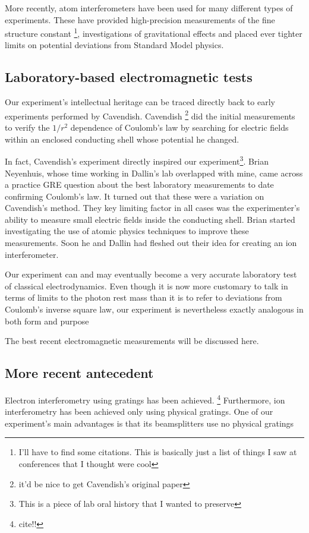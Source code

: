 More recently, atom interferometers have been used for many different types of experiments. These have provided high-precision measurements of the fine structure constant \footnote{I'll have to find some citations. This is basically just a list of things I saw at conferences that I thought were cool}, investigations of gravitational effects and placed ever tighter limits on potential deviations from Standard Model physics. 

\subsection{Laboratory-based electromagnetic tests}
Our experiment's intellectual heritage can be traced directly back to early experiments performed by Cavendish. Cavendish \cite{jackson} \footnote{it'd be nice to get Cavendish's original paper} did the initial measurements to verify the $1/r^2$ dependence of Coulomb's law by searching for electric fields \cite{jackson} within an enclosed conducting shell whose potential he changed. 

In fact, Cavendish's experiment directly inspired our experiment\footnote{This is a piece of lab oral history that I wanted to preserve}. Brian Neyenhuis, whose time working in Dallin's lab overlapped with mine, came across a practice GRE question about the best laboratory measurements to date confirming Coulomb's law. It turned out that these were a variation on Cavendish's method. They key limiting factor in all cases was the experimenter's ability to measure small electric fields inside the conducting shell. Brian started investigating the use of atomic physics techniques to improve these measurements. Soon he and Dallin had fleshed out their idea for creating an ion interferometer.  

Our experiment can and may eventually become a very accurate laboratory test of classical electrodynamics.
Even though it is now more customary to talk in terms of limits to the photon rest mass than it is to refer to deviations from Coulomb's inverse square law, our experiment is nevertheless exactly analogous in both form and purpose

The best recent electromagnetic measurements will be discussed here. 

\subsection{More recent antecedent}
Electron interferometry using gratings has been achieved. \footnote{cite!!} Furthermore, ion interferometry has been achieved only using physical gratings. One of our experiment's main advantages is that its beamsplitters use no physical gratings

